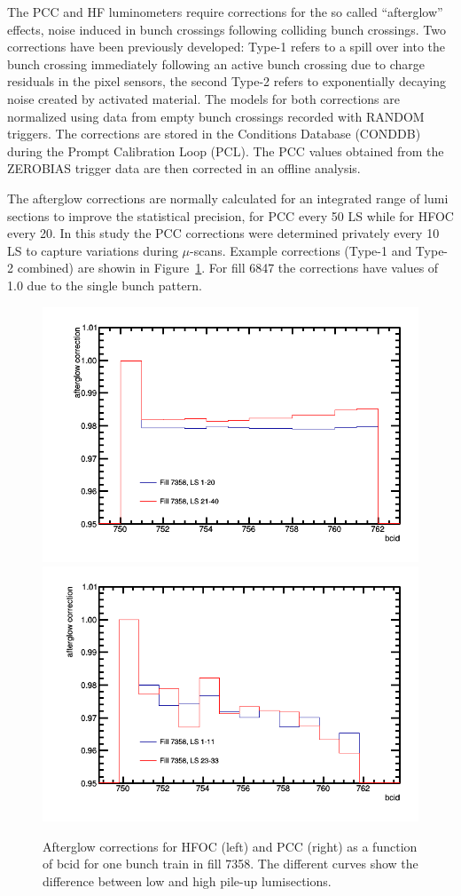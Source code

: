 
The PCC and HF luminometers  require corrections for the so called ``afterglow'' effects, noise induced in bunch crossings following colliding bunch crossings.
Two corrections have been previously developed: Type-1 refers to a spill over into the bunch crossing immediately following an active bunch crossing due to charge residuals in the pixel sensors, the second Type-2 refers to exponentially decaying noise created by activated material.
The models for both corrections are normalized using data from empty bunch crossings recorded with RANDOM triggers.
The corrections are stored in the Conditions Database (CONDDB) during the Prompt Calibration Loop (PCL).
The PCC values obtained from the ZEROBIAS trigger data are then corrected in an offline analysis.

The afterglow corrections are normally calculated for an integrated range of lumi sections to improve the statistical precision, for PCC every 50 LS while for HFOC every 20. In this study the PCC corrections were determined privately every 10 LS to capture variations during $\mu$-scans.
Example corrections (Type-1 and Type-2 combined) are showin in Figure~\ref{fig:afterglow}.
For fill 6847 the corrections have values of 1.0 due to the single bunch pattern.

\begin{figure}[t]
  \begin{center}
    \includegraphics[width=0.47\linewidth]{plots/HFAfterglowCorr.png}
    \includegraphics[width=0.47\linewidth]{plots/PCCAfterglowCorr.png}
    \caption{
      Afterglow corrections for HFOC (left) and PCC (right) as a function of bcid for one bunch train in fill 7358.
      The different curves show the difference between low and high pile-up lumisections.
    \label{fig:afterglow}
    }
  \end{center}
\end{figure}

